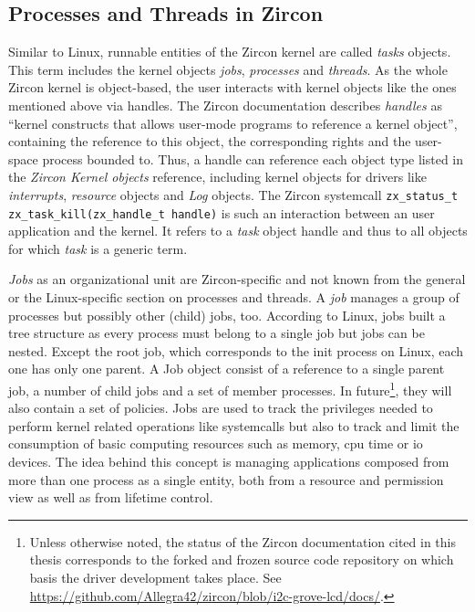 \subsection{Processes and Threads in Zircon}
Similar to Linux, runnable entities of the Zircon kernel are called \textit{tasks} objects.
This term includes the kernel objects \textit{jobs}, \textit{processes} and \textit{threads}.
As the whole Zircon kernel is object-based, the user interacts with kernel objects like the ones mentioned above via handles.
The Zircon documentation describes \textit{handles} as ``kernel constructs that allows user-mode programs to reference a kernel object''\cite{zircon-process}, containing the reference to this object, the corresponding rights and the user-space process bounded to.
Thus, a handle can reference each object type listed in the \textit{Zircon Kernel objects} reference\cite{zircon-objects}, including kernel objects for drivers like \textit{interrupts}, \textit{resource} objects and \textit{Log} objects.
The Zircon systemcall \texttt{zx\_status\_t zx\_task\_kill(zx\_handle\_t handle)} is such an interaction between an user application and the kernel. 
It refers to a \textit{task} object handle and thus to all objects for which \textit{task} is a generic term\cite{zircon-task}.

\textit{Jobs} as an organizational unit are Zircon-specific and not known from the general or the Linux-specific section on processes and threads.
A \textit{job} manages a group of processes but possibly other (child) jobs, too.
According to Linux, jobs built a tree structure as every process must belong to a single job but jobs can be nested.
Except the root job, which corresponds to the init process on Linux, each one has only one parent.
A Job object consist of a reference to a single parent job, a number of child jobs and a set of member processes.
In future\footnote{Unless otherwise noted, the status of the Zircon documentation cited in this thesis corresponds to the forked and frozen source code repository on which basis the driver development takes place. See \url{https://github.com/Allegra42/zircon/blob/i2c-grove-lcd/docs/}.}, they will also contain a set of policies\cite{zircon-job}.
Jobs are used to track the privileges needed to perform kernel related operations like systemcalls but also to track and limit the consumption of basic computing resources such as memory, \ac{cpu} time or \ac{io} devices\cite{zircon-job}.
The idea behind this concept is managing applications composed from more than one process as a single entity, both from a resource and permission view as well as from lifetime control\cite{zircon-process}.

